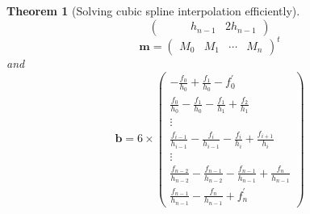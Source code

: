\documentclass[12pt]{article}
\newtheorem{theorem}{Theorem}[section]
\theoremstyle{definition}
\begin{document}
\begin{theorem}[Solving cubic spline interpolation efficiently]
\[\begin{pmatrix}
&&&h_{n-1}&2h_{n-1}\end{pmatrix}
\]
\[
\mathbf{m} = \begin{pmatrix} M_0&M_1&\cdots&M_{n}\end{pmatrix}^t
\]
and
\[
\mathbf{b} = 6\times\begin{pmatrix}
-\frac{f_0}{h_0}+\frac{f_1}{h_0}-f_0^\prime\\
\frac{f_0}{h_0}-\frac{f_1}{h_0}-\frac{f_1}{h_1}+\frac{f_2}{h_1}\\
\vdots\\
\frac{f_{i-1}}{h_{i-1}}-\frac{f_i}{h_{i-1}}-\frac{f_i}{h_i}+\frac{f_{i+1}}{h_i}\\
\vdots\\
\frac{f_{n-2}}{h_{n-2}}-\frac{f_{n-1}}{h_{n-2}}-\frac{f_{n-1}}{h_{n-1}}+\frac{f_n}{h_{n-1}}\\
\frac{f_{n-1}}{h_{n-1}}-\frac{f_n}{h_{n-1}}+f_n^\prime
\end{pmatrix}
\]
\end{theorem}
\end{document}
